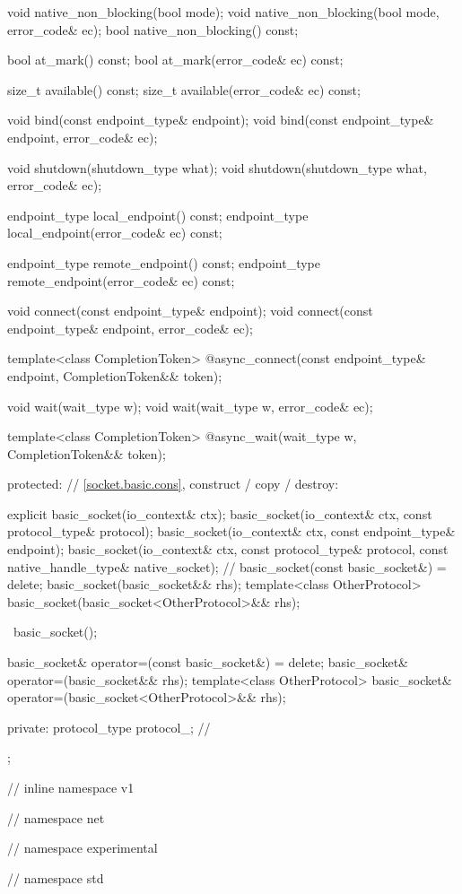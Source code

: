 \begin{codeblock}
{{{{{    void native_non_blocking(bool mode);
    void native_non_blocking(bool mode, error_code& ec);
    bool native_non_blocking() const;

    bool at_mark() const;
    bool at_mark(error_code& ec) const;

    size_t available() const;
    size_t available(error_code& ec) const;

    void bind(const endpoint_type& endpoint);
    void bind(const endpoint_type& endpoint, error_code& ec);

    void shutdown(shutdown_type what);
    void shutdown(shutdown_type what, error_code& ec);

    endpoint_type local_endpoint() const;
    endpoint_type local_endpoint(error_code& ec) const;

    endpoint_type remote_endpoint() const;
    endpoint_type remote_endpoint(error_code& ec) const;

    void connect(const endpoint_type& endpoint);
    void connect(const endpoint_type& endpoint, error_code& ec);

    template<class CompletionToken>
      @\DEDUCED@ async_connect(const endpoint_type& endpoint,
                            CompletionToken&& token);

    void wait(wait_type w);
    void wait(wait_type w, error_code& ec);

    template<class CompletionToken>
      @\DEDUCED@ async_wait(wait_type w, CompletionToken&& token);

  protected:
    // \ref{socket.basic.cons}, construct / copy / destroy:

    explicit basic_socket(io_context& ctx);
    basic_socket(io_context& ctx, const protocol_type& protocol);
    basic_socket(io_context& ctx, const endpoint_type& endpoint);
    basic_socket(io_context& ctx, const protocol_type& protocol,
                 const native_handle_type& native_socket); // \nativeref
    basic_socket(const basic_socket&) = delete;
    basic_socket(basic_socket&& rhs);
    template<class OtherProtocol>
      basic_socket(basic_socket<OtherProtocol>&& rhs);

    ~basic_socket();

    basic_socket& operator=(const basic_socket&) = delete;
    basic_socket& operator=(basic_socket&& rhs);
    template<class OtherProtocol>
      basic_socket& operator=(basic_socket<OtherProtocol>&& rhs);

  private:
    protocol_type protocol_; // \expos
  };

} // inline namespace v1
} // namespace net
} // namespace experimental
} // namespace std
\end{codeblock}

